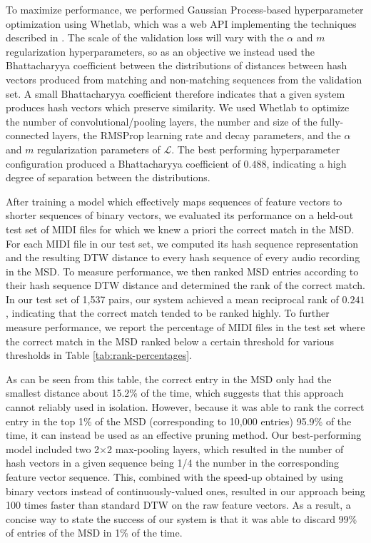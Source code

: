 \documentclass{article} %
\begin{document}
To maximize performance, we performed Gaussian Process-based hyperparameter optimization using Whetlab, which was a web API implementing the techniques described in \cite{snoek2012practical}.
The scale of the validation loss will vary with the $\alpha$ and $m$ regularization hyperparameters, so as an objective we instead used the Bhattacharyya coefficient between the distributions of distances between hash vectors produced from matching and non-matching sequences from the validation set.
A small Bhattacharyya coefficient therefore indicates that a given system produces hash vectors which preserve similarity.
We used Whetlab to optimize the number of convolutional/pooling layers, the number and size of the fully-connected layers, the RMSProp learning rate and decay parameters, and the $\alpha$ and $m$ regularization parameters of $\mathcal{L}$.
The best performing hyperparameter configuration produced a Bhattacharyya coefficient of $0.488$, indicating a high degree of separation between the distributions.

After training a model which effectively maps sequences of feature vectors to shorter sequences of binary vectors, we evaluated its performance on a held-out test set of MIDI files for which we knew a priori the correct match in the MSD.
For each MIDI file in our test set, we computed its hash sequence representation and the resulting DTW distance to every hash sequence of every audio recording in the MSD.
To measure performance, we then ranked MSD entries according to their hash sequence DTW distance and determined the rank of the correct match.
In our test set of 1,537 pairs, our system achieved a mean reciprocal rank of $0.241$, indicating that the correct match tended to be ranked highly.
To further measure performance, we report the percentage of MIDI files in the test set where the correct match in the MSD ranked below a certain threshold for various thresholds in Table \ref{tab:rank-percentages}.

As can be seen from this table, the correct entry in the MSD only had the smallest distance about 15.2\% of the time, which suggests that this approach cannot reliably used in isolation.
However, because it was able to rank the correct entry in the top 1\% of the MSD (corresponding to 10,000 entries) 95.9\% of the time, it can instead be used as an effective pruning method.
Our best-performing model included two 2$\times$2 max-pooling layers, which resulted in the number of hash vectors in a given sequence being 1/4 the number in the corresponding feature vector sequence.
This, combined with the speed-up obtained by using binary vectors instead of continuously-valued ones, resulted in our approach being 100 times faster than standard DTW on the raw feature vectors.
As a result, a concise way to state the success of our system is that it was able to discard 99\% of entries of the MSD in 1\% of the time.
\end{document}
